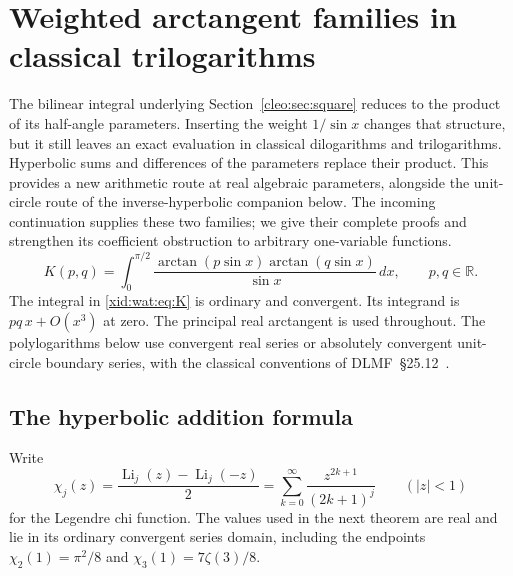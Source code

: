 \section{Weighted arctangent families in classical trilogarithms}
\label{xid:wat:sec}
The bilinear integral underlying Section~\ref{cleo:sec:square} reduces to the
product of its half-angle parameters. Inserting the weight $1/\sin x$
changes that structure, but it still leaves an exact evaluation in
classical dilogarithms and trilogarithms. Hyperbolic sums and differences
of the parameters replace their product. This provides a new arithmetic
route at real algebraic parameters, alongside the unit-circle route of
the inverse-hyperbolic companion below. The incoming continuation
\cite{xid:report} supplies these two families; we give their complete
proofs and strengthen its coefficient obstruction to arbitrary
one-variable functions.
\begin{equation}\label{xid:wat:eq:K}
 K(p,q)=\int_0^{\pi/2}
 \frac{\arctan(p\sin x)\arctan(q\sin x)}{\sin x}\,dx,
 \qquad p,q\in\mathbb R.
\end{equation}
The integral in \eqref{xid:wat:eq:K} is ordinary and convergent. Its integrand
is $pq\,x+O(x^3)$ at zero. The principal real arctangent is used
throughout. The polylogarithms below use convergent real series or
absolutely convergent unit-circle boundary series, with the classical
conventions of DLMF~\S25.12~\cite{rw:DLMFPolylog}.

\subsection{The hyperbolic addition formula}

Write
\[
 \chi_j(z)=\frac{\operatorname{Li}_j(z)-\operatorname{Li}_j(-z)}2
          =\sum_{k=0}^{\infty}\frac{z^{2k+1}}{(2k+1)^j}
 \qquad (|z|<1)
\]
for the Legendre chi function. The values used in the next theorem
are real and lie in its ordinary convergent series domain, including
the endpoints $\chi_2(1)=\pi^2/8$ and
$\chi_3(1)=7\zeta(3)/8$.

